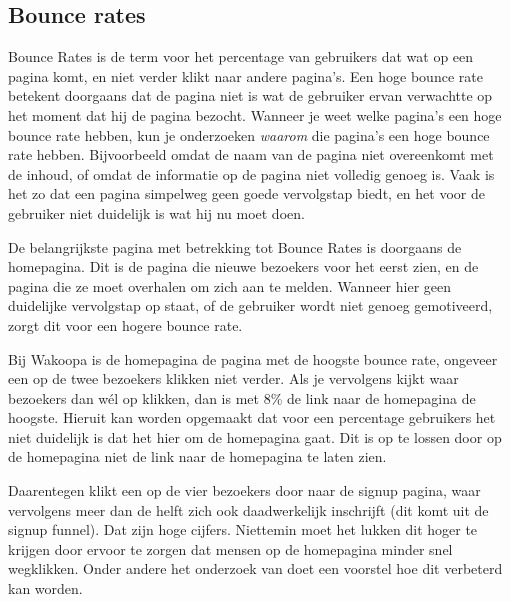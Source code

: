 \documentclass[a4paper, 10pt, pdftex]{report}
\begin{document}
    \subsection{Bounce rates}
    Bounce Rates is de term voor het percentage van gebruikers dat wat op een pagina komt, en niet verder klikt naar andere pagina's. Een hoge bounce rate betekent doorgaans dat de pagina niet is wat de gebruiker ervan verwachtte op het moment dat hij de pagina bezocht. Wanneer je weet welke pagina's een hoge bounce rate hebben, kun je onderzoeken \emph{waarom} die pagina's een hoge bounce rate hebben. Bijvoorbeeld omdat de naam van de pagina niet overeenkomt met de inhoud, of omdat de informatie op de pagina niet volledig genoeg is. Vaak is het zo dat een pagina simpelweg geen goede vervolgstap biedt, en het voor de gebruiker niet duidelijk is wat hij nu moet doen.

    De belangrijkste pagina met betrekking tot Bounce Rates is doorgaans de homepagina. Dit is de pagina die nieuwe bezoekers voor het eerst zien, en de pagina die ze moet overhalen om zich aan te melden. Wanneer hier geen duidelijke vervolgstap op staat, of de gebruiker wordt niet genoeg gemotiveerd, zorgt dit voor een hogere bounce rate.

    Bij Wakoopa is de homepagina de pagina met de hoogste bounce rate, ongeveer een op de twee bezoekers klikken niet verder. Als je vervolgens kijkt waar bezoekers dan w\'el op klikken, dan is met 8\% de link naar de homepagina de hoogste. Hieruit kan worden opgemaakt dat voor een percentage gebruikers het niet duidelijk is dat het hier om de homepagina gaat. Dit is op te lossen door op de homepagina niet de link naar de homepagina te laten zien.

    Daarentegen klikt een op de vier bezoekers door naar de signup pagina, waar vervolgens meer dan de helft zich ook daadwerkelijk inschrijft (dit komt uit de signup funnel). Dat zijn hoge cijfers. Niettemin moet het lukken dit hoger te krijgen door ervoor te zorgen dat mensen op de homepagina minder snel wegklikken. Onder andere het onderzoek van \cite{Hoekman2008} doet een voorstel hoe dit verbeterd kan worden.
\end{document}
